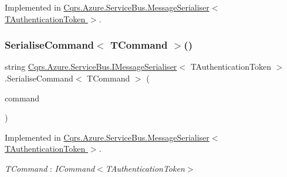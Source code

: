 Implemented in \hyperlink{classCqrs_1_1Azure_1_1ServiceBus_1_1MessageSerialiser_a7b96e89475e9218fcb7a690fe4d02279}{Cqrs.\+Azure.\+Service\+Bus.\+Message\+Serialiser$<$ T\+Authentication\+Token $>$}.

\mbox{\label{interfaceCqrs_1_1Azure_1_1ServiceBus_1_1IMessageSerialiser_a7454ac36eca3dd37d0c596e0406b4c81}} 
\subsubsection{\texorpdfstring{Serialise\+Command$<$ T\+Command $>$()}{SerialiseCommand< TCommand >()}}
{\footnotesize\ttfamily string \hyperlink{interfaceCqrs_1_1Azure_1_1ServiceBus_1_1IMessageSerialiser}{Cqrs.\+Azure.\+Service\+Bus.\+I\+Message\+Serialiser}$<$ T\+Authentication\+Token $>$.Serialise\+Command$<$ T\+Command $>$ (\begin{DoxyParamCaption}\item[{T\+Command}]{command }\end{DoxyParamCaption})}



Implemented in \hyperlink{classCqrs_1_1Azure_1_1ServiceBus_1_1MessageSerialiser_a50107f67d604c45136d9fa3d73400e3a}{Cqrs.\+Azure.\+Service\+Bus.\+Message\+Serialiser$<$ T\+Authentication\+Token $>$}.

\begin{Desc}
\item[Type Constraints]\begin{description}
\item[{\em T\+Command} : {\em I\+Command$<$T\+Authentication\+Token$>$}]\end{description}
\end{Desc}
\mbox{\label{interfaceCqrs_1_1Azure_1_1ServiceBus_1_1IMessageSerialiser_af6e1bca15164a08308969794b089c31b}} 
